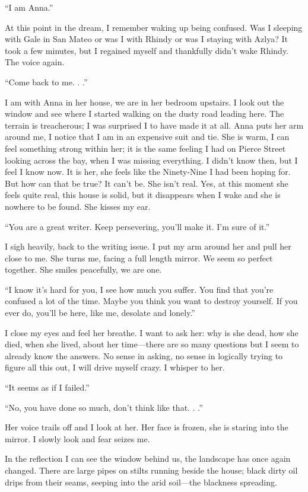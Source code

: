 ``I am Anna.''

At this point in the dream, I remember waking up being confused. Was I
sleeping with Gale in San Mateo or was I with Rhindy or was I staying
with Azlya? It took a few minutes, but I regained myself and thankfully
didn't wake Rhindy. The voice again.

``Come back to me. . .''

I am with Anna in her house, we are in her bedroom upstairs. I look out
the window and see where I started walking on the dusty road leading
here. The terrain is treacherous; I was surprised I to have made it at
all. Anna puts her arm around me, I notice that I am in an expensive
suit and tie. She is warm, I can feel something strong within her; it is
the same feeling I had on Pierce Street looking across the bay, when I
was missing everything. I didn't know then, but I feel I know now. It is
her, she feels like the Ninety-Nine I had been hoping for. But how can
that be true? It can't be. She isn't real. Yes, at this moment she feels
quite real, this house is solid, but it disappears when I wake and she
is nowhere to be found. She kisses my ear.

``You are a great writer. Keep persevering, you'll make it. I'm sure of
it.''

I sigh heavily, back to the writing issue. I put my arm around her and
pull her close to me. She turns me, facing a full length mirror. We seem
so perfect together. She smiles peacefully, we are one.

``I know it's hard for you, I see how much you suffer. You find that
you're confused a lot of the time. Maybe you think you want to destroy
yourself. If you ever do, you'll be here, like me, desolate and
lonely.''

I close my eyes and feel her breathe. I want to ask her: why is she
dead, how she died, when she lived, about her time---there are so many
questions but I seem to already know the answers. No sense in asking, no
sense in logically trying to figure all this out, I will drive myself
crazy. I whisper to her.

``It seems as if I failed.''

``No, you have done so much, don't think like that. . .''

Her voice trails off and I look at her. Her face is frozen, she is
staring into the mirror. I slowly look and fear seizes me.

In the reflection I can see the window behind us, the landscape has once
again changed. There are large pipes on stilts running beside the house;
black dirty oil drips from their seams, seeping into the arid soil---the
blackness spreading.

